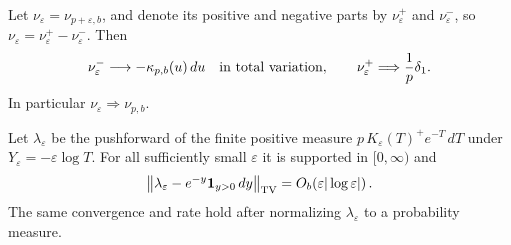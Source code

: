 \begin{theorem}
\label{rwbound:real:thm:boundary-mass}
Let $\nu_\varepsilon=\nu_{p+\varepsilon,b}$, and denote its positive
and negative parts by $\nu_\varepsilon^+$ and
$\nu_\varepsilon^-$, so $\nu_\varepsilon=
\nu_\varepsilon^+-\nu_\varepsilon^-$. Then
\begin{equation}\label{rwbound:real:eq:boundary-measures}
 \nu_\varepsilon^-\longrightarrow
       -\kappa_{p,b}(u)\,du\quad\hbox{in total variation},\qquad
 \nu_\varepsilon^+\Longrightarrow\frac1p\delta_1.
\end{equation}
In particular $\nu_\varepsilon\Longrightarrow\nu_{p,b}$.

Let $\lambda_\varepsilon$ be the pushforward of the finite positive
measure $p\,K_\varepsilon(T)^+e^{-T}\,dT$ under
$Y_\varepsilon=-\varepsilon\log T$. For all sufficiently small
$\varepsilon$ it is supported in $[0,\infty)$ and
\begin{equation}\label{rwbound:real:eq:exponential-law}
 \left\|\lambda_\varepsilon-e^{-y}\mathbf1_{y>0}\,dy
       \right\|_{\rm TV}
 =O_b\!\left(\varepsilon|\log\varepsilon|\right).
\end{equation}
The same convergence and rate hold after normalizing
$\lambda_\varepsilon$ to a probability measure.
\end{theorem}

